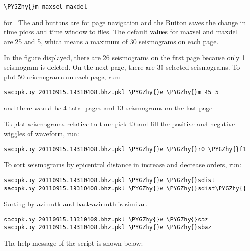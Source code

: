 \documentclass[letterpaper,10pt,english]{sphinxmanual}
\def\PYGZhy{\char`\-}
\begin{document}
\begin{Verbatim}[commandchars=\\\{\}]
\PYGZhy{}m maxsel maxdel
\end{Verbatim}

for . The  and  buttons are for page navigation and the  Button saves the change in time picks and time window to files. The default values for maxsel and maxdel are 25 and 5, which means a maximum of 30 seismograms on each page.

In the figure displayed, there are 26 seismograms on the first page because only 1 seismogram is deleted. On the next page, there are 30 selected seismograms. To plot 50 seismograms on each page, run:

\begin{Verbatim}[commandchars=\\\{\}]
sacppk.py 20110915.19310408.bhz.pkl \PYGZhy{}w \PYGZhy{}m 45 5
\end{Verbatim}

and there would be 4 total pages and 13 seismograms on the last page.

To plot seismograms relative to time pick t0 and fill the positive and negative wiggles of waveform, run:

\begin{Verbatim}[commandchars=\\\{\}]
sacppk.py 20110915.19310408.bhz.pkl \PYGZhy{}w \PYGZhy{}r0 \PYGZhy{}f1
\end{Verbatim}

To sort seismograms by epicentral distance in increase and decrease orders, run:

\begin{Verbatim}[commandchars=\\\{\}]
sacppk.py 20110915.19310408.bhz.pkl \PYGZhy{}w \PYGZhy{}sdist
sacppk.py 20110915.19310408.bhz.pkl \PYGZhy{}w \PYGZhy{}sdist\PYGZhy{}
\end{Verbatim}

Sorting by azimuth and back-azimuth is similar:

\begin{Verbatim}[commandchars=\\\{\}]
sacppk.py 20110915.19310408.bhz.pkl \PYGZhy{}w \PYGZhy{}saz
sacppk.py 20110915.19310408.bhz.pkl \PYGZhy{}w \PYGZhy{}sbaz
\end{Verbatim}

The help message of the  script is shown below:
\end{document}
